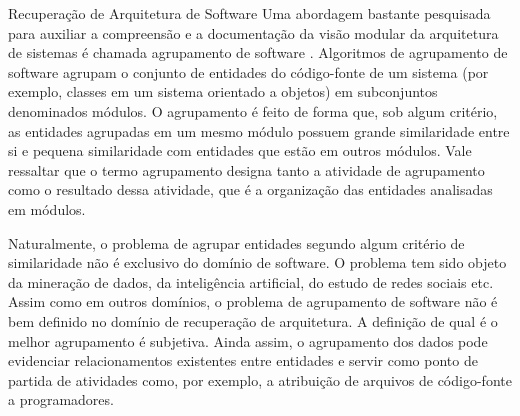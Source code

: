 \begin{section}{Recuperação de Arquitetura de Software}
Uma abordagem bastante pesquisada para auxiliar a compreensão e a documentação da visão modular da arquitetura de sistemas é chamada agrupamento de software \cite{Mancoridis1998,Andritsos2005,Maqbool2007}. Algoritmos de agrupamento de software agrupam o conjunto de entidades do código-fonte de um sistema (por exemplo, classes em um sistema orientado a objetos) em subconjuntos denominados módulos. O agrupamento é feito de forma que, sob algum critério, as entidades agrupadas em um mesmo módulo possuem grande similaridade entre si e pequena similaridade com entidades que estão em outros módulos. Vale ressaltar que o termo agrupamento designa tanto a atividade de agrupamento como o resultado dessa atividade, que é a organização das entidades analisadas em módulos.

Naturalmente, o problema de agrupar entidades segundo algum critério de similaridade não é exclusivo do domínio de software. O problema tem sido objeto da mineração de dados, da inteligência artificial, do estudo de redes sociais etc. Assim como em outros domínios, o problema de agrupamento de software não é bem definido no domínio de recuperação de arquitetura. A definição de qual é o melhor agrupamento é subjetiva. Ainda assim, o agrupamento dos dados pode evidenciar relacionamentos existentes entre entidades e servir como ponto de partida de atividades como, por exemplo, a atribuição de arquivos de código-fonte a programadores.


\end{section}

